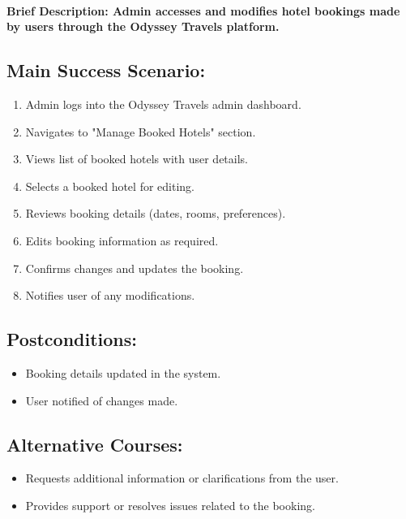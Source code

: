 \documentclass{scrreprt}
\begin{document}
\paragraph {\textnormal{Brief Description: 
Admin accesses and modifies hotel bookings made by users through the Odyssey Travels platform.}}

\subsection*{\textbf{Main Success Scenario:}}

\begin{enumerate}
    \item Admin logs into the Odyssey Travels admin dashboard.
    \item Navigates to "Manage Booked Hotels" section.
    \item Views list of booked hotels with user details.
    \item Selects a booked hotel for editing.
    \item Reviews booking details (dates, rooms, preferences).
    \item Edits booking information as required.
    \item Confirms changes and updates the booking.
    \item Notifies user of any modifications.
\end{enumerate}

\subsection*{\textbf{Postconditions:}}

\begin{itemize}
    \item Booking details updated in the system.
    \item User notified of changes made.
\end{itemize}

\subsection*{\textbf{Alternative Courses:}}

\begin{itemize}
    \item Requests additional information or clarifications from the user.
    \item Provides support or resolves issues related to the booking.
\end{itemize}
\end{document}
